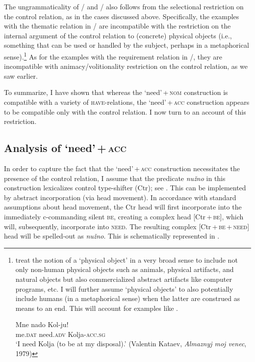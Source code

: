 \documentclass[output=paper]{langscibook}
\begin{document}
\noindent The ungrammaticality of / and  / also follows from the selectional restriction on the control relation, as in the cases discussed above. Specifically, the examples with the thematic relation in / are incompatible with the restriction on the internal argument of the control relation to (concrete) physical objects (i.e., something that can be used or handled by the subject, perhaps in a metaphorical sense).\footnote{\citet{Vikner.Jensen2002} treat the notion of a `physical object' in a very broad sense to include not only non-human physical objects such as animals, physical artifacts, and natural objects but also commercialized abstract artifacts like computer programs, etc. I will further assume `physical objects' to also potentially include humans (in a metaphorical sense) when the latter are construed as means to an end. This will account for examples like .

\ea \label{nuzhno-control-anim}
\gll Mne nado Kol-ju!\\
me.\textsc{dat} need.\textsc{adv} Kolja-\textsc{acc.sg}\\
\glt `I need Kolja (to be at my disposal).’ \hfill (Valentin Kataev, \textit{Almaznyj moj venec}, 1979)
\z
} As for the examples with the requirement relation in /, they are incompatible with animacy/volitionality restriction on the control relation, as we saw earlier.

To summarize, I have shown that whereas the `need'\,+\,\textsc{nom} construction is compatible with a variety of \textsc{have}-relations, the `need'\,+\,\textsc{acc} construction appears to be compatible only with the control relation. I now turn to an account of this restriction.

\subsection{Analysis of `need'\,+\,\textsc{acc}}\label{section-acc-analysis}

In order to capture the fact that the `need'\,+\,\textsc{acc} construction necessitates the presence of the control relation, I assume that the predicate \textit{nužno} in this construction lexicalizes  control type-shifter (Ctr); see . This can be implemented by abstract incorporation (via head movement). In accordance with standard assumptions about head movement, the Ctr head will first incorporate into the immediately c-commanding silent \textsc{be}, creating a complex head [Ctr\,+\,\textsc{be}], which will, subsequently, incorporate into \textsc{need}. The resulting complex [Ctr\,+\,\textsc{be}\,+\,\textsc{need}] head will be spelled-out as \textit{nužno}. This is schematically represented in .
\end{document}
